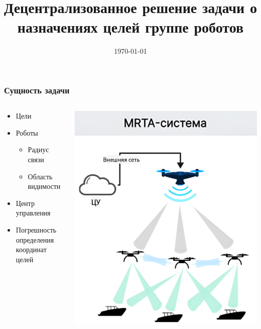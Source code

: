 \documentclass{beamer}
\title{Децентрализованное решение задачи о назначениях целей группе роботов}
\author{}
\date{\today}
\begin{document}
	
	\begin{frame}[plain]
		\titlepage
	\end{frame}
	
	\begin{frame}
		\frametitle{Сущность задачи}
		\begin{columns}[T] %
			\begin{column}{0.5\textwidth} %
				\begin{itemize}
					\item Цели
					\item Роботы
					\begin{itemize}
					\item Радиус связи
					\item Область видимости
					\end{itemize}
					\item Центр управления
					\item Погрешность определения координат целей
				\end{itemize}
			\end{column}
			\begin{column}{0.5\textwidth} %
				\centering
				\includegraphics[width=\textwidth,height=0.85\textheight,keepaspectratio]{mrta1.png}
			\end{column}
		\end{columns}
	\end{frame}
\end{document}
